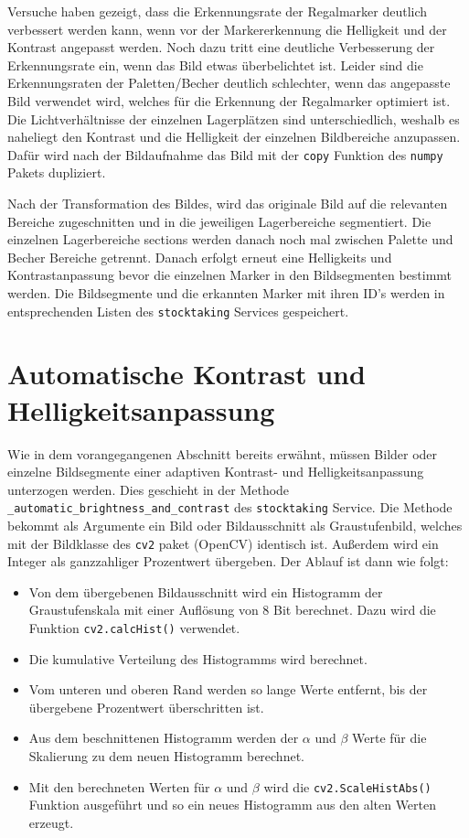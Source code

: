     Versuche haben gezeigt, dass die Erkennungsrate der Regalmarker deutlich verbessert werden kann, wenn vor der Markererkennung die Helligkeit und der Kontrast angepasst werden. 
    Noch dazu tritt eine deutliche Verbesserung der Erkennungsrate ein, wenn das Bild etwas überbelichtet ist. 
    Leider sind die Erkennungsraten der Paletten/Becher deutlich schlechter, wenn das angepasste Bild verwendet wird, welches für die Erkennung der Regalmarker optimiert ist. 
    Die Lichtverhältnisse der einzelnen Lagerplätzen sind unterschiedlich, weshalb es naheliegt den Kontrast und die Helligkeit der einzelnen Bildbereiche anzupassen. 
    Dafür wird nach der Bildaufnahme das Bild mit der \verb|copy| Funktion des \verb|numpy| Pakets dupliziert.

    Nach der Transformation des Bildes, wird das originale Bild auf die relevanten Bereiche zugeschnitten und in die jeweiligen Lagerbereiche segmentiert.
    Die einzelnen Lagerbereiche \glqq sections \grqq werden danach noch mal zwischen Palette und Becher Bereiche getrennt. 
    Danach erfolgt erneut eine Helligkeits und Kontrastanpassung bevor die einzelnen Marker in den Bildsegmenten bestimmt werden. 
    Die Bildsegmente und die erkannten Marker mit ihren ID's werden in entsprechenden Listen des \verb|stocktaking| Services gespeichert.

    \section {Automatische Kontrast und Helligkeitsanpassung}
    Wie in dem vorangegangenen Abschnitt bereits erwähnt, müssen Bilder oder einzelne Bildsegmente einer adaptiven Kontrast- und Helligkeitsanpassung unterzogen werden. 
    Dies geschieht in der Methode \verb|_automatic_brightness_and_contrast| des \verb|stocktaking| Service. 
    Die Methode bekommt als Argumente ein Bild oder Bildausschnitt als Graustufenbild, welches mit der Bildklasse des \verb|cv2| paket (OpenCV) identisch ist. 
    Außerdem wird ein Integer als ganzzahliger Prozentwert übergeben.
    Der Ablauf ist dann wie folgt: 
    \begin{itemize}
        \item Von dem übergebenen Bildausschnitt wird ein Histogramm der Graustufenskala mit einer Auflösung von 8 Bit berechnet. Dazu wird die Funktion \verb|cv2.calcHist()| verwendet.
        \item Die kumulative Verteilung des Histogramms wird berechnet.
        \item Vom unteren und oberen Rand werden so lange Werte entfernt, bis der übergebene Prozentwert überschritten ist. 
        \item Aus dem beschnittenen Histogramm werden der $\alpha$ und $\beta$ Werte für die Skalierung zu dem neuen Histogramm berechnet. 
        \item Mit den berechneten Werten für $\alpha$ und $\beta$ wird die \verb|cv2.ScaleHistAbs()| Funktion ausgeführt und so ein neues Histogramm aus den alten Werten erzeugt. 
    \end{itemize}


